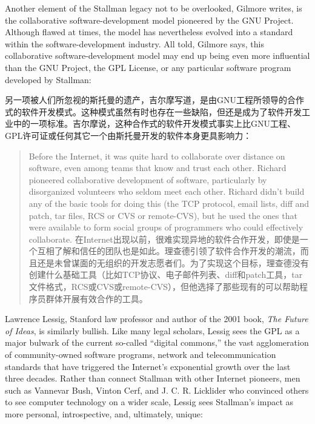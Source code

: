 \ifdefined\eng
Another element of the Stallman legacy not to be overlooked, Gilmore writes, is the collaborative software-development model pioneered by the GNU Project. Although flawed at times, the model has nevertheless evolved into a standard within the software-development industry. All told, Gilmore says, this collaborative software-development model may end up being even more influential than the GNU Project, the GPL License, or any particular software program developed by Stallman:
\fi

\ifdefined\chs
另一项被人们所忽视的斯托曼的遗产，吉尔摩写道，是由GNU工程所领导的合作式的软件开发模式。这种模式虽然有时也存在一些缺陷，但还是成为了软件开发工业中的一项标准。吉尔摩说，这种合作式的软件开发模式事实上比GNU工程、GPL许可证或任何其它一个由斯托曼开发的软件本身更具影响力：
\fi

\begin{quote}
\ifdefined\eng
Before the Internet, it was quite hard to collaborate over distance on software, even among teams that know and trust each other. Richard pioneered collaborative development of software, particularly by disorganized volunteers who seldom meet each other. Richard didn't build any of the basic tools for doing this (the TCP protocol, email lists, diff and patch, tar files, RCS or CVS or remote-CVS), but he used the ones that were available to form social groups of programmers who could effectively collaborate.
\fi
\ifdefined\chs
在Internet出现以前，很难实现异地的软件合作开发，即使是一个互相了解和信任的团队也是如此。理查德引领了软件合作开发的潮流，而且还是未曾谋面的无组织的开发志愿者们。为了实现这个目标，理查德没有创建什么基础工具（比如TCP协议、电子邮件列表、diff和patch工具，tar文件格式，RCS或CVS或remote-CVS），但他选择了那些现有的可以帮助程序员群体开展有效合作的工具。
\fi
\end{quote}



\ifdefined\eng
Lawrence Lessig, Stanford law professor and author of the 2001 book, \textit{The Future of Ideas}, is similarly bullish. Like many legal scholars, Lessig sees the GPL as a major bulwark of the current so-called ``digital commons,'' the vast agglomeration of community-owned software programs, network and telecommunication standards that have triggered the Internet's exponential growth over the last three decades. Rather than connect Stallman with other Internet pioneers, men such as Vannevar Bush, Vinton Cerf, and J. C. R. Licklider who convinced others to see computer technology on a wider scale, Lessig sees Stallman's impact as more personal, introspective, and, ultimately, unique:
\fi

